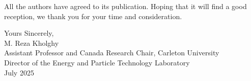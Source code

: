 \begin{titlepage}
	All the authors have agreed to its publication. Hoping that it will find a good reception, we thank you for your time and consideration. 
	
	\vspace{1cm}
	\noindent Yours Sincerely,\\
	M. Reza Kholghy\\
	Assistant Professor and Canada Research Chair, Carleton University\\
	Director of the Energy and Particle Technology Laboratory\\
	July 2025
	
	\vfill
	
	
\end{titlepage}
\clearpage
